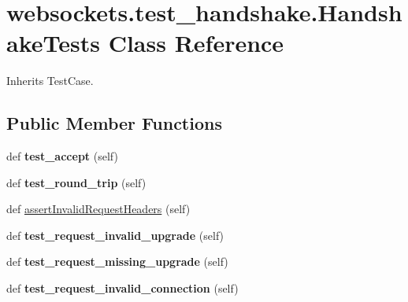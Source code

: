 \hypertarget{classwebsockets_1_1test__handshake_1_1_handshake_tests}{}\section{websockets.\+test\+\_\+handshake.\+Handshake\+Tests Class Reference}
\label{classwebsockets_1_1test__handshake_1_1_handshake_tests}


Inherits Test\+Case.

\subsection*{Public Member Functions}
\begin{DoxyCompactItemize}
\item 
\mbox{\label{classwebsockets_1_1test__handshake_1_1_handshake_tests_a3cf1bed5dfb906e3bd9d3a5c3f2dd39b}} 
def {\bfseries test\+\_\+accept} (self)
\item 
\mbox{\label{classwebsockets_1_1test__handshake_1_1_handshake_tests_af5a9e31885387a6596b87b28c94edda0}} 
def {\bfseries test\+\_\+round\+\_\+trip} (self)
\item 
def \hyperlink{classwebsockets_1_1test__handshake_1_1_handshake_tests_a05467c97736022ff3fc93ce113a07f57}{assert\+Invalid\+Request\+Headers} (self)
\item 
\mbox{\label{classwebsockets_1_1test__handshake_1_1_handshake_tests_ac005badfa30aca8b29686842a1b70d41}} 
def {\bfseries test\+\_\+request\+\_\+invalid\+\_\+upgrade} (self)
\item 
\mbox{\label{classwebsockets_1_1test__handshake_1_1_handshake_tests_a6f473f76e2c1a2500758fc9a4f4dfb27}} 
def {\bfseries test\+\_\+request\+\_\+missing\+\_\+upgrade} (self)
\item 
\mbox{\label{classwebsockets_1_1test__handshake_1_1_handshake_tests_abd50b4553cf112f2eddf774de4bba91d}} 
def {\bfseries test\+\_\+request\+\_\+invalid\+\_\+connection} (self)

\end{DoxyCompactItemize}
